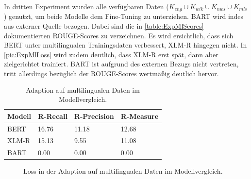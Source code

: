 \noindent
In dritten Experiment wurden alle verfügbaren Daten ($K_{eng} \cup K_{wik} \cup K_{nws} \cup K_{mls}$) genutzt, um beide Modelle dem Fine-Tuning zu unterziehen. \ac{BART} wird indes aus externer Quelle bezogen. Dabei sind die in \autoref{table:ExpMlScores} dokumentierten \ac{ROUGE}-Scores zu verzeichnen. Es wird ersichtlich, dass sich \ac{BERT} unter multilingualen Trainingsdaten verbessert, \ac{XLM-R} hingegen nicht. In \autoref{pic:ExpMlLoss} wird zudem deutlich, dass \ac{XLM-R} erst spät, dann aber zielgerichtet trainiert. \ac{BART} ist aufgrund des externen Bezugs nicht vertreten, tritt allerdings bezüglich der \ac{ROUGE}-Scores wertmäßig deutlich hervor.\\

\begin{table}[htb]
\centering
\begin{tabular}{ | p{2.5cm} | p{2.5cm} | p{2.5cm} | p{2.5cm} | }
\hline
\textbf{Modell} & \textbf{R-Recall} & \textbf{R-Precision} & \textbf{R-Measure} \\
\hline
BERT & 16.76 & 11.18 & 12.68 \\
\hline
XLM-R & 15.13 & 9.55 & 11.08 \\
\hline
BART & 0.00 & 0.00 & 0.00 \\
\hline
\end{tabular}
\caption{Adaption auf multilingualen Daten im Modellvergleich.}
\label{table:ExpMlScores}
\end{table}

\begin{figure}[h]
  \centering
  \caption{Loss in der Adaption auf multilingualen Daten im Modellvergleich.}
  \label{pic:ExpMlLoss}
\end{figure}
\newpage


